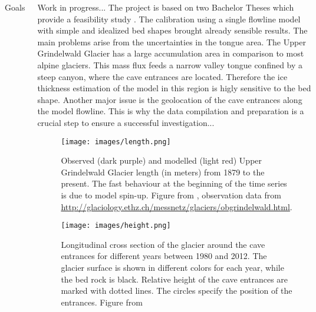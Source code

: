 \documentclass[final]{beamer}
\begin{document}
\begin{frame}[fragile]
\begin{columns}[t]
\begin{leftcolumn}
\begin{boxblock}{Goals}
      
   \end{boxblock}

\end{leftcolumn} 


\begin{rightcolumn}

   \begin{boxblock}{Work in progress...}
    The project is based on two Bachelor Theses which provide a feasibility study \citep[cf.][]{Oberrauch2016, Gstir2016}. The calibration using a single flowline model with simple and idealized bed shapes brought already sensible results. The main problems arise from the uncertainties in the tongue area. The Upper Grindelwald Glacier has a large accumulation area in comparison to most alpine glaciers. This mass flux feeds a narrow valley tongue confined by a steep canyon, where the cave entrances are located. Therefore the ice thickness estimation of the model in this region is higly sensitive to the bed shape. Another major issue is the geolocation of the cave entrances along the model flowline. This is why the data compilation and preparation is a crucial step to ensure a successful investigation...
    \begin{figure}[ht]
      \centering
      \texttt{[image: images/length.png]}
      \caption{Observed (dark purple) and modelled (light red) Upper Grindelwald Glacier length (in meters) from 1879 to the present. The fast behaviour at the beginning of the time series is due to model spin-up. Figure from \citet{Oberrauch2016}, observation data from \url{http://glaciology.ethz.ch/messnetz/glaciers/obgrindelwald.html}.}
      \label{fig:length}
    \end{figure}
    \begin{figure}[ht]
      \centering
      \texttt{[image: images/height.png]}
      \caption{Longitudinal cross section of the glacier around the cave entrances for different years between 1980 and 2012. The glacier surface is shown in different colors for each year, while the bed rock is black. Relative height of the cave entrances are marked with dotted lines. The circles specify the position of the entrances. Figure from \citet{Oberrauch2016}}
      \label{fig:height}
    \end{figure}
      


\end{boxblock}
\end{rightcolumn}
\end{columns}
\end{frame}
\end{document}
